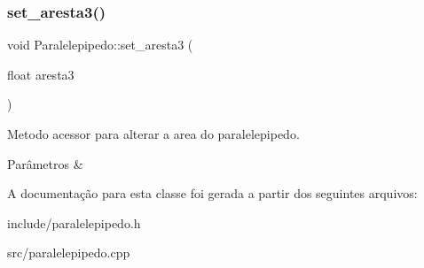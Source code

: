 \subsubsection{\texorpdfstring{set\+\_\+aresta3()}{set\_aresta3()}}
{\footnotesize\ttfamily void Paralelepipedo\+::set\+\_\+aresta3 (\begin{DoxyParamCaption}\item[{float}]{aresta3 }\end{DoxyParamCaption})}



Metodo acessor para alterar a area do paralelepipedo. 


\begin{DoxyParams}{Parâmetros}
{\em } & \\
\hline
\end{DoxyParams}


A documentação para esta classe foi gerada a partir dos seguintes arquivos\+:\begin{DoxyCompactItemize}
\item 
include/paralelepipedo.\+h\item 
src/paralelepipedo.\+cpp\end{DoxyCompactItemize}
